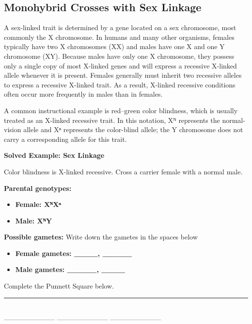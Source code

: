 \documentclass[
  letterpaper,
  DIV=11,
  numbers=noendperiod]{scrreprt}
\begin{document}
\subsection{\texorpdfstring{\textbf{Monohybrid Crosses with Sex
Linkage}}{Monohybrid Crosses with Sex Linkage}}\label{monohybrid-crosses-with-sex-linkage}

A sex-linked trait is determined by a gene located on a sex chromosome,
most commonly the X chromosome. In humans and many other organisms,
females typically have two X chromosomes (XX) and males have one X and
one Y chromosome (XY). Because males have only one X chromosome, they
possess only a single copy of most X-linked genes and will express a
recessive X-linked allele whenever it is present. Females generally must
inherit two recessive alleles to express a recessive X-linked trait. As
a result, X-linked recessive conditions often occur more frequently in
males than in females.

A common instructional example is red--green color blindness, which is
usually treated as an X-linked recessive trait. In this notation, Xᴺ
represents the normal-vision allele and Xⁿ represents the color-blind
allele; the Y chromosome does not carry a corresponding allele for this
trait.

\textbf{Solved Example: Sex Linkage}

Color blindness is X-linked recessive. Cross a carrier female with a
normal male.

\textbf{Parental genotypes:}

\begin{itemize}
\item
  \textbf{Female: XᴺXⁿ}
\item
  \textbf{Male: XᴺY}
\end{itemize}

\textbf{Possible gametes:} Write down the gametes in the spaces below

\begin{itemize}
\item
  \textbf{Female gametes: \_\_\_\_, \_\_\_\_\_}
\item
  \textbf{Male gametes: \_\_\_\_\_, \_\_\_\_}
\end{itemize}

Complete the Punnett Square below.

\begin{center}\rule{0.5\linewidth}{0.5pt}\end{center}

\textbf{~~}\\
----------------------- ----------------------- -----------------------
\end{document}
